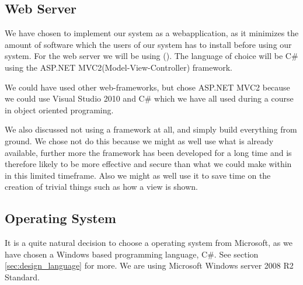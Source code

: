 \subsection{Web Server}
\label{subsec:webserver}


We have chosen to implement our system as a webapplication, as it minimizes the amount of software which the users of our system has to install before using our system. 
For the web server we will be using  \wholeiis[] (\iis[]). 
The language of choice will be C\# using the ASP.NET MVC2(Model-View-Controller) framework.

We could have used other web-frameworks, but chose ASP.NET MVC2 because we could use Visual Studio 2010 and C\# which we have all used during a course in object oriented programing.

We also discussed not using a framework at all, and simply build everything from ground.
We chose not do this because we might as well use what is already available, further more the framework has been developed for a long time and is therefore likely to be more effective and secure than what we could make within in this limited timeframe.
Also we might as well use it to save time on the creation of trivial things such as how a view is shown.

\subsection{Operating System}
\label{subsec:operating_system}
It is a quite natural decision to choose a operating system from Microsoft, as we have chosen a Windows based programming language, C\#. See section \ref{sec:design_language} for more.
We are using Microsoft Windows server 2008 R2 Standard. 